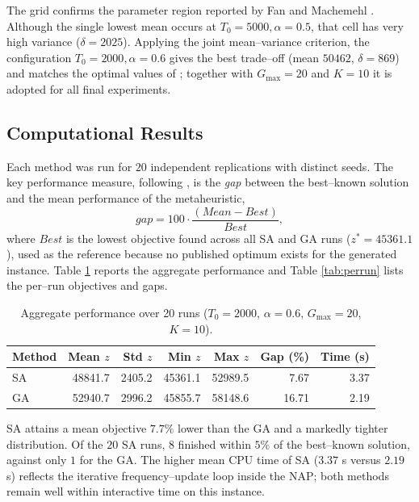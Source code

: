 \documentclass [a4paper, 11pt, titlepage] {article}
\begin{document}
The grid confirms the parameter region reported by Fan and Machemehl
\cite{fan2006}. Although the single lowest mean occurs at
$T_0{=}5000,\alpha{=}0.5$, that cell has very high variance ($\delta=2025$).
Applying the joint mean--variance criterion, the configuration
$T_0{=}2000,\alpha{=}0.6$ gives the best trade--off (mean $50462$, $\delta=869$)
and matches the optimal values of \cite{fan2006}; together with $G_{\max}=20$
and $K=10$ it is adopted for all final experiments.

\subsection{Computational Results}
Each method was run for $20$ independent replications with distinct seeds. The
key performance measure, following \cite{fan2006}, is the \emph{gap} between the
best--known solution and the mean performance of the metaheuristic,
\begin{equation}
  gap = 100 \cdot \frac{(Mean - Best)}{Best}, \nonumber
\end{equation}
where $Best$ is the lowest objective found across all SA and GA runs ($z^{*} =
45361.1$), used as the reference because no published optimum exists for the
generated instance. Table \ref{tab:summary} reports the aggregate performance
and Table \ref{tab:perrun} lists the per--run objectives and gaps.

\begin{table}[!htb]
  \centering
  \begin{tabular}{|l|r|r|r|r|r|r|}
    \hline
    Method & Mean $z$ & Std $z$ & Min $z$ & Max $z$ & Gap (\%) & Time (s) \\
    \hline
    SA & 48841.7 & 2405.2 & 45361.1 & 52989.5 & 7.67  & 3.37 \\
    GA & 52940.7 & 2996.2 & 45855.7 & 58148.6 & 16.71 & 2.19 \\
    \hline
  \end{tabular}
  \caption{Aggregate performance over 20 runs
  ($T_0{=}2000$, $\alpha{=}0.6$, $G_{\max}{=}20$, $K{=}10$).}
  \label{tab:summary}
\end{table}

SA attains a mean objective $7.7\%$ lower than the GA and a markedly tighter
distribution. Of the $20$ SA runs, $8$ finished within $5\%$ of the best--known
solution, against only $1$ for the GA. The higher mean CPU time of SA
($3.37$ s versus $2.19$ s) reflects the iterative frequency--update loop inside
the NAP; both methods remain well within interactive time on this instance.
\end{document}
